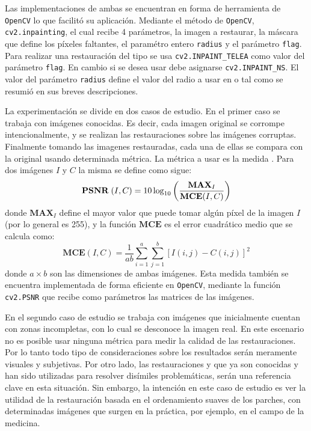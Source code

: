 Las implementaciones de ambas se encuentran en forma de herramienta de \texttt{OpenCV} lo que facilit\'o su aplicaci\'on. Mediante el m\'etodo de \texttt{OpenCV}, \texttt{cv2.inpainting}, el cual recibe 4 par\'ametros, la imagen a restaurar, la m\'ascara que define los p\'ixeles faltantes, el param\'etro entero \texttt{radius} y el par\'ametro \texttt{flag}. Para realizar una restauraci\'on del tipo \TELEA se usa \texttt{cv2.INPAINT\_TELEA} como valor del par\'ametro \texttt{flag}. En cambio si se desea usar \NS debe asignarse \texttt{cv2.INPAINT\_NS}. El valor del par\'ametro \texttt{radius} define el valor del radio a usar en \TELEA o \NS tal como se resumi\'o en sus breves descripciones.

La experimentaci\'on se divide en dos casos de estudio. En el primer caso se trabaja con im\'agenes conocidas. Es decir, cada imagen original se corrompe intencionalmente, y se realizan las restauraciones sobre las im\'agenes corruptas. Finalmente tomando las imagenes restauradas, cada una de ellas se compara con la original usando determinada m\'etrica. La m\'etrica a usar es la medida \PSNR \cite{enwiki:psnr}. Para dos im\'agenes $I$ y $C$ la misma se define como sigue:
\begin{equation}
	\textbf{PSNR}\;(I, C) = 10 \log_{10} \left(\frac{\textbf{MAX}_I}{\textbf{MCE}(I, C)}\right)
\end{equation}
donde $\textbf{MAX}_I$ define el mayor valor que puede tomar alg\'un p\'ixel de la imagen $I$ (por lo general es 255), y la funci\'on $\textbf{MCE}$ es el error cuadr\'atico medio que se calcula como:
\begin{equation}
	\textbf{MCE}(I, C) = \frac{1}{ab}\sum_{i=1}^{a}\sum_{j=1}^{b}[I(i, j) - C(i, j)]^2
\end{equation}
donde $a \times b$ son las dimensiones de ambas im\'agenes. Esta medida tambi\'en se encuentra implementada de forma eficiente en \texttt{OpenCV}, mediante la funci\'on \texttt{cv2.PSNR} que recibe como par\'ametros las matrices de las im\'agenes.

En el segundo caso de estudio se trabaja con im\'agenes que inicialmente cuentan con zonas incompletas, con lo cual se desconoce la imagen real. En este escenario no es posible usar ninguna m\'etrica para medir la calidad de las restauraciones. Por lo tanto todo tipo de consideraciones sobre los resultados ser\'an meramente visuales y subjetivas. Por otro lado, las restauraciones \TELEA y \NS que ya son conocidas y han sido utilizadas para resolver dis\'imiles problem\'aticas, ser\'an una referencia clave en esta situaci\'on. Sin embargo, la intenci\'on en este caso de estudio es ver la utilidad de la restauraci\'on basada en el ordenamiento suaves de los parches, con determinadas im\'agenes que surgen en la pr\'actica, por ejemplo, en el campo de la medicina.

